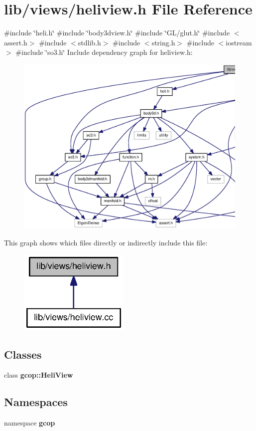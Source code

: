 \section{lib/views/heliview.h \-File \-Reference}
\label{heliview_8h}
{\ttfamily \#include \char`\"{}heli.\-h\char`\"{}}\*
{\ttfamily \#include \char`\"{}body3dview.\-h\char`\"{}}\*
{\ttfamily \#include \char`\"{}\-G\-L/glut.\-h\char`\"{}}\*
{\ttfamily \#include $<$assert.\-h$>$}\*
{\ttfamily \#include $<$stdlib.\-h$>$}\*
{\ttfamily \#include $<$string.\-h$>$}\*
{\ttfamily \#include $<$iostream$>$}\*
{\ttfamily \#include \char`\"{}so3.\-h\char`\"{}}\*
\-Include dependency graph for heliview.\-h\-:
\nopagebreak
\begin{figure}[H]
\begin{center}
\leavevmode
\includegraphics[width=350pt]{heliview_8h__incl}
\end{center}
\end{figure}
\-This graph shows which files directly or indirectly include this file\-:
\nopagebreak
\begin{figure}[H]
\begin{center}
\leavevmode
\includegraphics[width=150pt]{heliview_8h__dep__incl}
\end{center}
\end{figure}
\subsection*{\-Classes}
\begin{DoxyCompactItemize}
\item 
class {\bf gcop\-::\-Heli\-View}
\end{DoxyCompactItemize}
\subsection*{\-Namespaces}
\begin{DoxyCompactItemize}
\item 
namespace {\bf gcop}
\end{DoxyCompactItemize}
